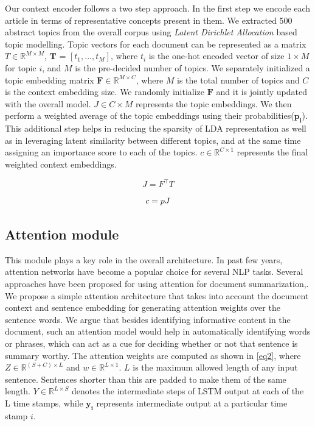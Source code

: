 Our context encoder follows a two step approach. In the first step we encode each article in terms of representative concepts present in them. We extracted 500 abstract topics from the overall corpus using \emph{Latent Dirichlet Allocation} based topic modelling. Topic vectors for each document can be represented as a matrix  $T \in \mathbb{R}^{M\times M}$, $\boldsymbol{T}$ = $[t_1,...,t_M]$, where $t_i$ is the one-hot encoded vector of size $1 \times M$ for topic $i$, and $M$ is the pre-decided number of topics. We separately initialized a topic embedding matrix $\boldsymbol{F} \in \mathbb{R}^{M\times C}$, where $M$ is the total number of topics and  $C$ is the context embedding size. We randomly initialize $\boldsymbol{F}$ and it is jointly updated with the overall model. $J \in C\times M$ represents the topic embeddings. We then perform a weighted average of the topic embeddings using their probabilities($\boldsymbol{p_i}$). This additional step helps in reducing the sparsity of LDA representation as well as in leveraging latent similarity between different topics, and at the same time assigning an importance score to each of the topics. $c \in \mathbb{R}^{C\times 1}$ represents the final weighted context embeddings.

\begin{equation}
J =  F^\intercal T
\label{eq3}
\end{equation}

\begin{equation}
c = \boldmath p \unboldmath J
\end{equation}

\subsection{Attention module} This module plays a key role in the overall architecture. In past few years, attention networks have become a popular choice for several NLP tasks. Several approaches have been proposed for using attention for document summarization\cite{cheng2016neural},\cite{rush2015neural}. We propose a simple attention architecture that takes into account the document context and sentence embedding for generating attention weights over the sentence words. We argue that besides identifying informative content in the document, such an attention model would help in automatically identifying words or phrases, which can act as a cue for deciding whether or not that sentence is summary worthy. The attention weights are computed as shown in \ref{eq2}, where $Z \in \mathbb{R}^{(S+C)\times L}$ and $w \in \mathbb{R}^{L\times1}$. $L$ is the maximum allowed length of any input sentence. Sentences shorter than this are padded to make them of the same length. $Y \in \mathbb{R}^{L\times S}$ denotes the intermediate steps of LSTM output at each of the L time stamps, while $\boldsymbol{y_i}$ represents intermediate output at a particular time stamp $i$.

